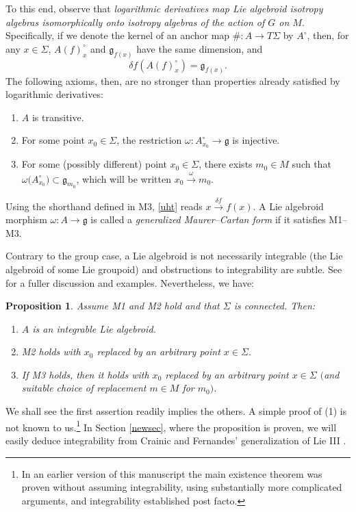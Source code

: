 \documentclass[pdftex]{sigma}%
\numberwithin{equation}{section}
\newtheorem{Proposition}[Theorem]{Proposition}
\begin{document}
To this end, observe that {\it logarithmic derivatives map Lie
algebroid isotropy algebras isomorphically onto isotropy algebras of
the action of $G$ on $M$}. Specifically, if we denote the kernel of an
anchor map $\#\colon A \rightarrow T \Sigma$ by $A^\circ $, then, for
any $x \in \Sigma$, $A(f )_x^\circ$ and ${\mathfrak g}_{f(x)}$ have the
same dimension, and
\begin{equation}
\delta f(A(f)_x^\circ) = {\mathfrak g}_{f(x)}.
 \label{uht}
\end{equation}
The following axioms, then, are no stronger than
properties already satisfied by logarithmic derivatives:
\begin{enumerate}\itemsep=0pt
\item[M1] $A$ is transitive.
\item[M2] For some point $x_0 \in \Sigma $, the restriction
$\omega \colon A^\circ_{x_0} \rightarrow {\mathfrak g}$ is injective.
\item[M3] For some (possibly different) point $x_0 \in \Sigma $,
there exists $m_0 \in M$ such that $\omega\big(A^\circ_{x_0}\big) \subset
{\mathfrak g}_{m_0}$, which will be written $x_0\xrightarrow{\omega}m_0$.
\end{enumerate}
%
Using the shorthand defined in M3, \eqref{uht} reads $x
\xrightarrow{\delta f} f(x)$. A Lie algebroid morphism $\omega \colon
A \rightarrow {\mathfrak g}$ is called a {\it generalized
Maurer--Cartan form} if it satisfies M1--M3.

Contrary to the group case, a Lie algebroid is not necessarily
integrable (the Lie algebroid of some Lie groupoid) and obstructions
to integrability are subtle. See \cite{Crainic_Fernandes_11} for a
fuller discussion and examples. Nevertheless, we have:
\begin{Proposition}\label{frogP}
Assume {\normalfont M1} and {\normalfont M2} hold
and that $\Sigma$ is connected. Then:
 \begin{enumerate}\itemsep=0pt
 \item[$1.$] $A$ is an integrable Lie algebroid.%
 \item[$2.$] {\normalfont M2} holds with $x_0$ replaced by an arbitrary
point $x \in \Sigma $.%
 \item[$3.$] If {\normalfont M3} holds, then it holds with $x_0$
replaced by an arbitrary point $x \in \Sigma $ $($and suitable choice of
replacement $m \in M$ for $m_0)$.%
 \end{enumerate}
\end{Proposition}
%
We shall see the first assertion readily implies the others. A simple
proof of (1) is not known to us.\footnote{In an earlier
 version of this manuscript the main existence theorem was proven
 without assuming integrability, using substantially more complicated
 arguments, and integrability established post facto.} In Section
\ref{newsec}, where the proposition is proven, we will easily deduce
integrability from Crainic and Fernandes' generalization of Lie III
\cite{Crainic_Fernandes_03}.
\end{document}
